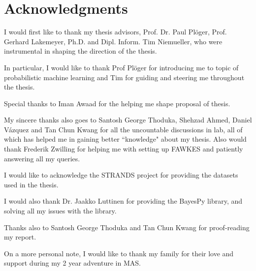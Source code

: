  
\chapter*{Acknowledgments}

I would first like to thank my thesis advisors, Prof. Dr. Paul Pl\"{o}ger, Prof. Gerhard Lakemeyer, Ph.D. and Dipl. Inform. Tim Niemueller, who were instrumental in shaping the direction of the thesis. 

In particular, I would like to thank Prof Pl\"{o}ger for introducing me to topic of probabilistic machine learning and Tim for guiding and steering me throughout the thesis. 

Special thanks to Iman Awaad for the helping me shape proposal of thesis.

My sincere thanks also goes to  Santosh George Thoduka, Shehzad Ahmed, Daniel Vázquez and Tan Chun Kwang for all the uncountable discussions in lab,
 all of which has helped me in gaining better ``knowledge" about my thesis.  Also would thank Frederik Zwilling for helping me with setting up FAWKES and patiently answering all my queries. 

I would like to acknowledge the STRANDS project for providing the datasets used in the thesis. 
 
I would also thank Dr. Jaakko Luttinen for providing the BayesPy library, and solving all my issues with the library. 

Thanks also to Santosh George Thoduka and Tan Chun Kwang for proof-reading my report.

On a more personal note, I would like to thank my family for their love and support during my 2 year adventure in MAS.